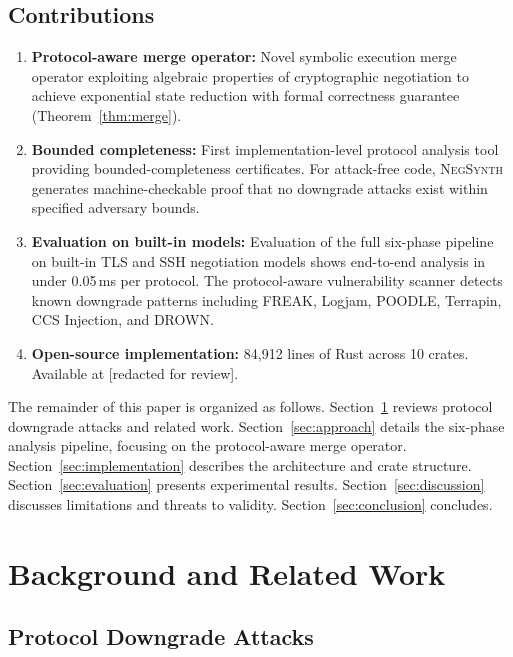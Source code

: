 \documentclass[10pt,twocolumn]{article}
\begin{document}
\subsection{Contributions}

\begin{enumerate}[leftmargin=*]
\item \textbf{Protocol-aware merge operator:} Novel symbolic execution merge operator exploiting algebraic properties of cryptographic negotiation to achieve exponential state reduction with formal correctness guarantee (Theorem~\ref{thm:merge}).

\item \textbf{Bounded completeness:} First implementation-level protocol analysis tool providing bounded-completeness certificates. For attack-free code, \textsc{NegSynth} generates machine-checkable proof that no downgrade attacks exist within specified adversary bounds.

\item \textbf{Evaluation on built-in models:} Evaluation of the full six-phase pipeline on built-in TLS and SSH negotiation models shows end-to-end analysis in under 0.05\,ms per protocol. The protocol-aware vulnerability scanner detects known downgrade patterns including FREAK, Logjam, POODLE, Terrapin, CCS Injection, and DROWN.

\item \textbf{Open-source implementation:} 84{,}912 lines of Rust across 10 crates. Available at [redacted for review].
\end{enumerate}

The remainder of this paper is organized as follows. Section~\ref{sec:background} reviews protocol downgrade attacks and related work. Section~\ref{sec:approach} details the six-phase analysis pipeline, focusing on the protocol-aware merge operator. Section~\ref{sec:implementation} describes the architecture and crate structure. Section~\ref{sec:evaluation} presents experimental results. Section~\ref{sec:discussion} discusses limitations and threats to validity. Section~\ref{sec:conclusion} concludes.

\section{Background and Related Work}
\label{sec:background}

\subsection{Protocol Downgrade Attacks}
\end{document}

